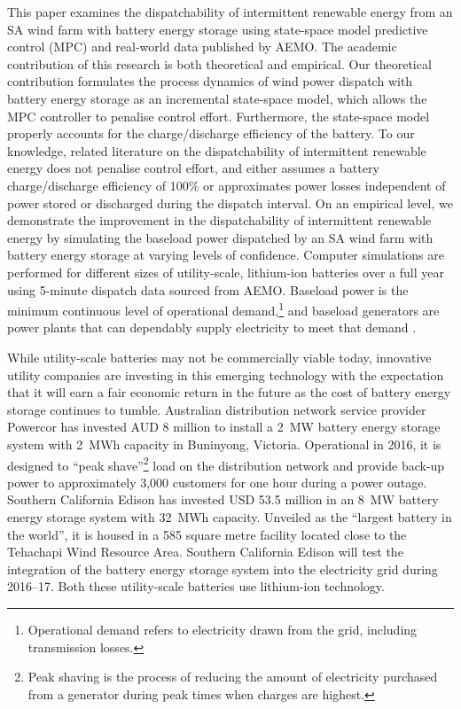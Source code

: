 This paper examines the dispatchability of intermittent renewable energy from an SA wind farm with battery energy storage using state-space model predictive control (MPC) and real-world data published by AEMO.  The academic contribution of this research is both theoretical and empirical.  Our theoretical contribution formulates the process dynamics of wind power dispatch with battery energy storage as an incremental state-space model, which allows the MPC controller to penalise control effort.  Furthermore, the state-space model properly accounts for the charge/discharge efficiency of the battery.  To our knowledge, related literature on the dispatchability of intermittent renewable energy does not penalise control effort, and either assumes a battery charge/discharge efficiency of 100\% or approximates power losses independent of power stored or discharged during the dispatch interval.  On an empirical level, we demonstrate the improvement in the dispatchability of intermittent renewable energy by simulating the baseload power dispatched by an SA wind farm with battery energy storage at varying levels of confidence.  Computer simulations are performed for different sizes of utility-scale, lithium-ion batteries over a full year using 5-minute dispatch data sourced from AEMO.  Baseload power is the minimum continuous level of operational demand,\footnote{
Operational demand refers to electricity drawn from the grid, including transmission losses.
}  and baseload generators are power plants that can dependably supply electricity to meet that demand \citep{NS11}.

While utility-scale batteries may not be commercially viable today, innovative utility companies are investing in this emerging technology with the expectation that it will earn a fair economic return in the future as the cost of battery energy storage continues to tumble.  Australian distribution network service provider Powercor has invested AUD 8 million to install a 2~MW battery energy storage system with 2~MWh capacity in Buninyong, Victoria.  Operational in 2016, it is designed to ``peak shave''\footnote{Peak shaving is the process of reducing the amount of electricity purchased from a generator during peak times when charges are highest.
} load on the distribution network and provide back-up power to approximately 3,000 customers for one hour during a power outage.  Southern California Edison has invested USD 53.5 million in an 8~MW battery energy storage system with 32~MWh capacity.  Unveiled as the ``largest battery in the world'', it is housed in a 585 square metre facility located close to the Tehachapi Wind Resource Area.  Southern California Edison will test the integration of the battery energy storage system into the electricity grid during 2016--17.  Both these utility-scale batteries use lithium-ion technology.

